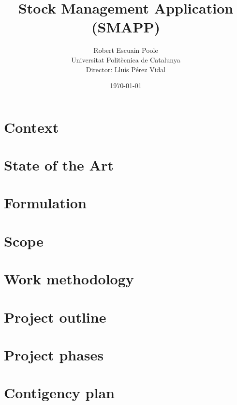 \documentclass{report}
\begin{document}
    \title{\bfseries Stock Management Application (SMAPP)}
    \author{Robert Escuain Poole\\[\bigskipamount]Universitat Politècnica de Catalunya\\Director: Lluís Pérez Vidal}
    \date{\today}
    \maketitle

    \tableofcontents

    \chapter{Context}
    
    
    \chapter{State of the Art}
    
    
    \chapter{Formulation}
    
    
    \chapter{Scope}
    
    
    \chapter{Work methodology}
    
    
    \chapter{Project outline}
    
    
    \chapter{Project phases}
    
    
    \chapter{Contigency plan}
    
    
\end{document}
